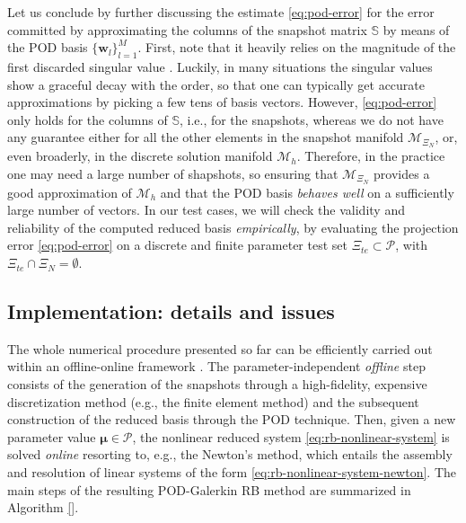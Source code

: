 \documentclass[12pt, a4paper, twoside, openright]{report}
\numberwithin{equation}{chapter}
\theoremstyle{theorem}
\theoremstyle{definition}
\theoremstyle{remark}
\theoremstyle{proposition}
\numberwithin{figure}{chapter}
\newcommand{\bg}[1]{\boldsymbol{#1}}
\begin{document}
		Let us conclude by further discussing the estimate \eqref{eq:pod-error} for the error committed by approximating the columns of the snapshot matrix $\mathbb{S}$ by means of the POD basis $\big\lbrace \mathbf{w}_l \big\rbrace_{l = 1}^M$. First, note that it heavily relies on the magnitude of the first discarded singular value \cite{HSR16}. Luckily, in many situations the singular values show a graceful decay with the order, so that one can typically get accurate approximations by picking a few tens of basis vectors. However, \eqref{eq:pod-error} only holds for the columns of $\mathbb{S}$, i.e., for the snapshots, whereas we do not have any guarantee either for all the other elements in the snapshot manifold $\mathcal{M}_{\Xi_N}$, or, even broaderly, in the discrete solution manifold $\mathcal{M}_h$. Therefore, in the practice one may need a large number of shapshots, so ensuring that $\mathcal{M}_{\Xi_N}$ provides a good approximation of $\mathcal{M}_h$ and that the POD basis \emph{behaves well} on a sufficiently large number of vectors. In our test cases, we will check the validity and reliability of the computed reduced basis \emph{empirically}, by evaluating the projection error \eqref{eq:pod-error} on a discrete and finite parameter test set $\Xi_{te} \subset \mathcal{P}$, with $\Xi_{te} \cap \Xi_N = \emptyset$.
		
	\subsection{Implementation: details and issues}
	\label{section:Implementation}
	
		The whole numerical procedure presented so far can be efficiently carried out within an offline-online framework \cite{Pru02}. The parameter-independent \emph{offline} step consists of the generation of the snapshots through a high-fidelity, expensive discretization method (e.g., the finite element method) and the subsequent construction of the reduced basis through the POD technique. Then, given a new parameter value $\bg{\mu} \in \mathcal{P}$, the nonlinear reduced system \eqref{eq:rb-nonlinear-system} is solved \emph{online} resorting to, e.g., the Newton's method, which entails the assembly and resolution of linear systems of the form \eqref{eq:rb-nonlinear-system-newton}. The main steps of the resulting POD-Galerkin RB method are summarized in Algorithm \ref{}.
		
\end{document}
